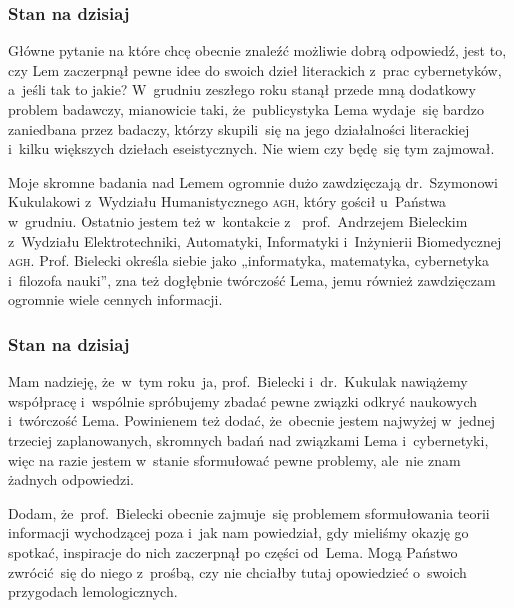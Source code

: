 \documentclass[10pt,t]{beamer}
\begin{document}
\begin{frame}
  \frametitle{Stan na dzisiaj}


  Główne pytanie na które chcę obecnie znaleźć możliwie dobrą odpowiedź,
  jest to, czy Lem zaczerpnął pewne idee do swoich dzieł literackich z~prac
  cybernetyków, a~jeśli tak to jakie? W~grudniu zeszłego roku stanął przede
  mną dodatkowy problem badawczy, mianowicie taki, że~publicystyka Lema
  wydaje~się bardzo zaniedbana przez badaczy, którzy skupili~się na jego
  działalności literackiej i~kilku większych dziełach eseistycznych. Nie wiem
  czy będę~się tym zajmował.

  Moje skromne badania nad Lemem ogromnie dużo zawdzięczają
  {dr.~Szymonowi Kukulakowi} z~Wydziału Humanistycznego \textsc{agh}, który
  gościł u~Państwa w~grudniu. Ostatnio jestem też w~kontakcie
  z~
  {prof.~Andrzejem Bieleckim} z~Wydziału Elektrotechniki, Automatyki,
  Informatyki i~Inżynierii Biomedycznej \textsc{agh}. Prof. Bielecki określa
  siebie jako „informatyka, matematyka, cybernetyka i~filozofa nauki”, zna
  też dogłębnie twórczość Lema, jemu również zawdzięczam ogromnie wiele
  cennych informacji.

\end{frame}





\begin{frame}
  \frametitle{Stan na dzisiaj}


  Mam nadzieję, że~w~tym roku~ja, prof.~Bielecki i~dr.~Kukulak nawiążemy
  współpracę i~wspólnie spróbujemy zbadać pewne związki odkryć naukowych
  i~twórczość Lema. Powinienem też dodać, że~obecnie jestem najwyżej
  w~jednej trzeciej zaplanowanych, skromnych badań nad związkami Lema
  i~cybernetyki, więc na razie jestem w~stanie sformułować pewne problemy,
  ale~nie znam żadnych odpowiedzi.

  Dodam, że~prof.~Bielecki obecnie zajmuje~się problemem sformułowania
  teorii informacji wychodzącej poza
   i~jak nam powiedział, gdy mieliśmy okazję go spotkać,
  inspiracje do nich zaczerpnął po części od~Lema. Mogą Państwo zwrócić~się
  do niego z~prośbą, czy nie chciałby tutaj opowiedzieć o~swoich przygodach
  lemologicznych.

\end{frame}
\end{document}

